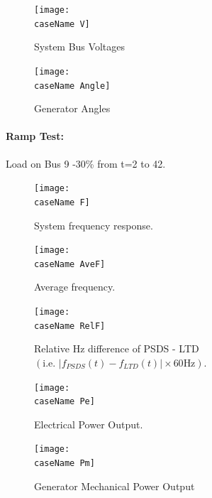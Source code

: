 \documentclass[12pt]{article}
\begin{document}
	\begin{figure}[h!]
			\centering
			\texttt{[image: \\caseName V]}\vspace{-.5em}
			\caption{System Bus Voltages}
			\label{\caseName V}		 
	\end{figure}%
	\begin{figure}[h!]
			\centering
			\texttt{[image: \\caseName Angle]}\vspace{-.5em}
			\caption{Generator Angles}
			\label{\caseName Angle}		 
	\end{figure}%


\pagebreak
\renewcommand{\caseName}{kundurRamp}
\renewcommand{\figW}{1}
\paragraph{Ramp Test:} Load on Bus 9 -30\% from t=2 to 42.
	\begin{figure}[h!]
			\centering
			\texttt{[image: \\caseName F]}\vspace{-.5em}
			\caption{System frequency response.}
			\label{\caseName F}		 
	\end{figure}%
	\begin{figure}[h!]
			\centering
			\texttt{[image: \\caseName AveF]}\vspace{-.5em}
			\caption{Average frequency.}
			\label{\caseName AveF}		 
	\end{figure}%


	\begin{figure}[h!]
			\centering
			\texttt{[image: \\caseName RelF]}\vspace{-.5em}
			\caption{Relative Hz difference of PSDS - LTD $\left( \text{i.e. }  \left|f_{PSDS}(t)- f_{LTD}(t)\right| \times 60 \text{Hz} \right)$.}
			\label{\caseName RelF}		 
	\end{figure}%

\pagebreak
	\begin{figure}[h!]
			\centering
			\texttt{[image: \\caseName Pe]}\vspace{-.5em}
			\caption{Electrical Power Output.}
			\label{\caseName Pe}		 
	\end{figure}%
	\begin{figure}[h!]
			\centering
			\texttt{[image: \\caseName Pm]}\vspace{-.5em}
			\caption{Generator Mechanical Power Output}
			\label{\caseName Pm}		 
	\end{figure}%
\end{document}
